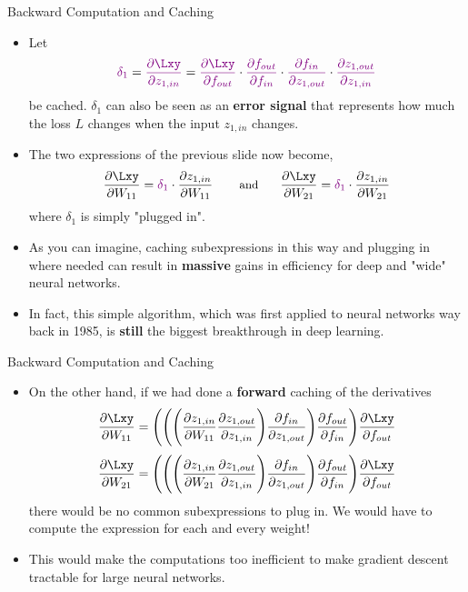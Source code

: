 \begin{frame} {Backward Computation and Caching}
\begin{itemize}
\item Let {\small $$\textcolor{violet}{\delta_1}  = \textcolor{violet}{\frac{\partial \Lxy}{\partial z_{1,in}}} = 
\textcolor{violet}{\frac{\partial \Lxy}{\partial f_{out}}} \cdot  \textcolor{violet}{\frac{\partial f_{out}}{\partial f_{in}}} \cdot  \textcolor{violet}{\frac{\partial f_{in}}{\partial z_{1,out}}} \cdot  \textcolor{violet}{\frac{\partial z_{1,out}}{\partial z_{1,in}}}$$} be cached. $\delta_1$ can also be seen as an \textbf{error signal} that represents how much the loss $L$ changes when the input $z_{1,in}$ changes.

\item The two expressions of the previous slide now become,
{\small $$\frac{\partial \Lxy}{\partial W_{11}} = \textcolor{violet}{\delta_1} \cdot \frac{\partial z_{1,in}}{\partial W_{11}} \mbox{ \hspace{0.5cm} \small{and} \hspace{0.5cm}} \frac{\partial \Lxy}{\partial W_{21}} = \textcolor{violet}{\delta_1} \cdot \frac{\partial z_{1,in}}{\partial W_{21}} $$}
where $\delta_1$ is simply "plugged in".
\item As you can imagine, caching subexpressions in this way and plugging in where needed can result in \textbf{massive} gains in efficiency for deep and "wide" neural networks. 
\item In fact, this simple algorithm, which was first applied to neural networks way back in 1985, is \textbf{still} the biggest breakthrough in deep learning.
\end{itemize}
\end{frame}

\begin{frame} {Backward Computation and Caching}
  \begin{itemize}
    \item On the other hand, if we had done a \textbf{forward} caching of the derivatives
    {\small $$\frac{\partial \Lxy}{\partial W_{11}} = \Bigg(\Bigg(\Bigg( \frac{\partial z_{1,in}}{\partial W_{11}} \frac{\partial z_{1,out}}{\partial z_{1,in}} \Bigg)  \frac{\partial f_{in}}{\partial z_{1,out}} \Bigg) \frac{\partial f_{out}}{\partial f_{in}} \Bigg) \frac{\partial \Lxy}{\partial f_{out}}$$}
      {\small $$\frac{\partial \Lxy}{\partial W_{21}} = 
        \Bigg(\Bigg(\Bigg( \frac{\partial z_{1,in}}{\partial W_{21}} \frac{\partial z_{1,out}}{\partial z_{1,in}} \Bigg)  \frac{\partial f_{in}}{\partial z_{1,out}} \Bigg) \frac{\partial f_{out}}{\partial f_{in}} \Bigg) \frac{\partial \Lxy}{\partial f_{out}}$$}
      there would be no common subexpressions to plug in. We would have to compute the  expression for each and every weight!
    \item This would make the computations too inefficient to make gradient descent tractable for large neural networks.
  \end{itemize}
\end{frame}



